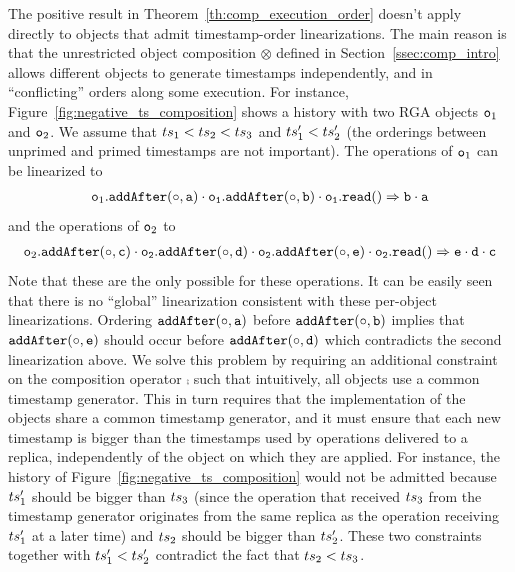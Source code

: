 The positive result in Theorem~\ref{th:comp_execution_order} doesn't apply directly to objects that admit timestamp-order linearizations. The main reason is that the unrestricted object composition $\otimes$ defined in Section~\ref{ssec:comp_intro} allows different objects to generate timestamps independently, and in ``conflicting'' orders along some execution. For instance, Figure~\ref{fig:negative_ts_composition} shows a history with two RGA objects $\mathtt{o}_1$ and $\mathtt{o}_2$. We assume that $ts_1 < ts_2 < ts_3$ and $ts'_1 < ts'_2$ (the orderings between unprimed and primed timestamps are not important). The operations of $\mathtt{o}_1$ can be linearized to
\begin{align*}
\aobj_1.\alabelshort[{\tt addAfter}]{\circ,a}\cdot \aobj_1.\alabelshort[{\tt addAfter}]{\circ,b}\cdot \aobj_1.\alabellongind[{\tt read}]{}{b\cdot a}{}
\end{align*}
and the operations of $\mathtt{o}_2$ to
\begin{align*}
\aobj_2.\alabelshort[{\tt addAfter}]{\circ,c}\cdot \aobj_2.\alabelshort[{\tt addAfter}]{\circ,d}\cdot \aobj_2.\alabelshort[{\tt addAfter}]{\circ,e}\cdot \aobj_2.\alabellongind[{\tt read}]{}{e\cdot d\cdot c}{}
\end{align*}
Note that these are the only  possible for these operations. It can be easily seen that there is no ``global'' linearization consistent with these per-object linearizations. Ordering $\alabelshort[{\tt addAfter}]{\circ,a}$ before $\alabelshort[{\tt addAfter}]{\circ,b}$ implies that $\alabelshort[{\tt addAfter}]{\circ,e}$ should occur before $\alabelshort[{\tt addAfter}]{\circ,d}$ which contradicts the second linearization above.
We solve this problem by requiring an additional constraint on the composition operator $\comp$ such that intuitively, all objects use a common timestamp generator. This in turn requires that the implementation of the objects share a common timestamp generator, and it must ensure that each new timestamp is bigger than the  timestamps used by operations delivered to a replica, independently of the object on which they are applied. For instance, the history of Figure~\ref{fig:negative_ts_composition} would not be admitted because $ts_1'$ should be bigger than $ts_3$ (since the operation that received $ts_3$ from the timestamp generator originates from the same replica as the operation receiving $ts_1'$ at a later time) and $ts_2$ should be bigger than $ts_2'$. These two constraints together with $ts_1'<ts_2'$ contradict the fact that $ts_2 < ts_3$.

